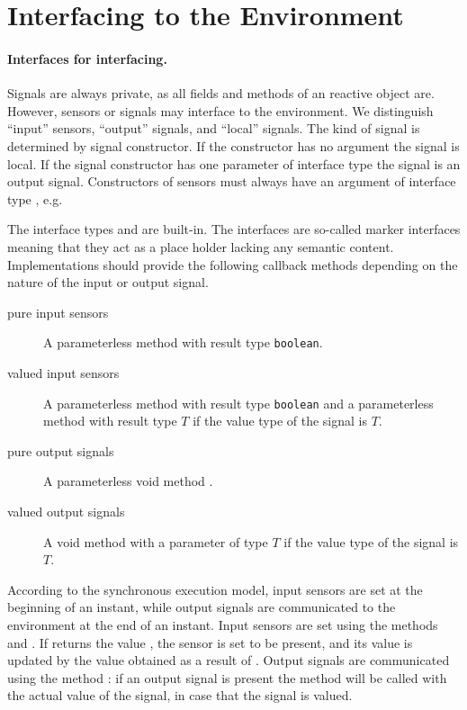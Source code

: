 \section{Interfacing to the Environment}\label{interface}

\paragraph{Interfaces for interfacing.} Signals are always private, 
as all fields and methods of an reactive object are. However, sensors or signals may interface to the environment. We distinguish ``input'' sensors, ``output'' signals, and ``local'' signals. The kind of signal is determined 
by signal constructor. If the constructor has no argument the signal 
is local. If the signal constructor has one parameter of interface 
type  the signal is an output signal. Constructors of sensors
must always have an argument of interface type , e.g. 
%
% 

The interface types 
 and 
 are built-in. The interfaces
are so-called marker interfaces meaning that they act as a place holder
lacking any semantic content. Implementations should provide the following
callback methods
 depending on the nature of the input or output signal.
\begin{description}
\item[pure input sensors] A parameterless method  with result type \texttt{boolean}. 

\item[valued input sensors] A parameterless method  with result type \texttt{boolean} and a parameterless method  with result type $T$ if the value type of the signal is $T$.

\item[pure output signals] A parameterless void method . 

\item[valued output signals] A void method  with a parameter of type $T$ if the value type of the signal is $T$.
\end{description}

According to the synchronous execution model, input sensors are set 
at the beginning of an instant, while output signals are communicated 
to the environment at the end of an instant. Input sensors are set 
using the methods  and . If 
 returns the value , the sensor is set to be present, 
and its value is updated by the value obtained as a result of 
. Output signals are communicated using the method 
: if an output signal is present the method 
 will be called with the actual value of the signal, in case that the signal is valued.

